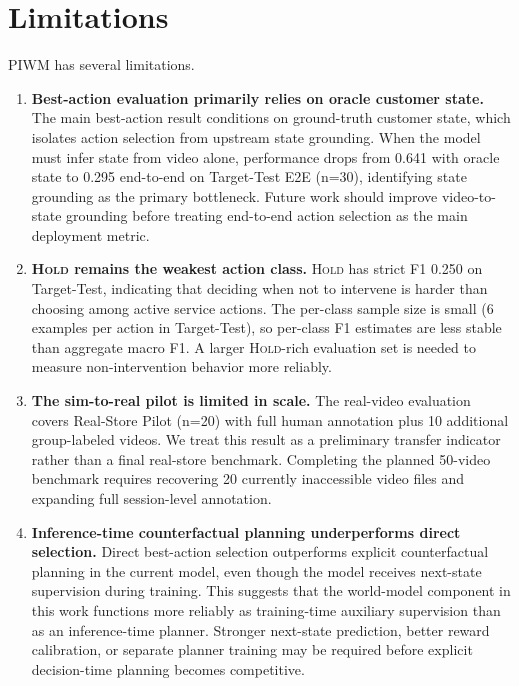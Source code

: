 \section*{Limitations}
\label{sec:limitations}

PIWM has several limitations.

\begin{enumerate}
    \item \textbf{Best-action evaluation primarily relies on oracle customer state.}
    The main best-action result conditions on ground-truth customer state, which isolates action selection from upstream state grounding. When the model must infer state from video alone, performance drops from 0.641 with oracle state to 0.295 end-to-end on Target-Test E2E (n=30), identifying state grounding as the primary bottleneck. Future work should improve video-to-state grounding before treating end-to-end action selection as the main deployment metric.

    \item \textbf{\textsc{Hold} remains the weakest action class.}
    \textsc{Hold} has strict F1 0.250 on Target-Test, indicating that deciding when not to intervene is harder than choosing among active service actions. The per-class sample size is small (6 examples per action in Target-Test), so per-class F1 estimates are less stable than aggregate macro F1. A larger \textsc{Hold}-rich evaluation set is needed to measure non-intervention behavior more reliably.

    \item \textbf{The sim-to-real pilot is limited in scale.}
    The real-video evaluation covers Real-Store Pilot (n=20) with full human annotation plus 10 additional group-labeled videos. We treat this result as a preliminary transfer indicator rather than a final real-store benchmark. Completing the planned 50-video benchmark requires recovering 20 currently inaccessible video files and expanding full session-level annotation.

    \item \textbf{Inference-time counterfactual planning underperforms direct selection.}
    Direct best-action selection outperforms explicit counterfactual planning in the current model, even though the model receives next-state supervision during training. This suggests that the world-model component in this work functions more reliably as training-time auxiliary supervision than as an inference-time planner. Stronger next-state prediction, better reward calibration, or separate planner training may be required before explicit decision-time planning becomes competitive.


\end{enumerate}
